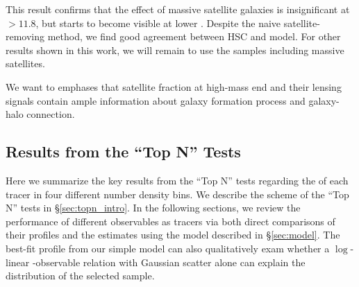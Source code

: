 \documentclass[a4paper,fleqn,usenatbib]{mnras}
\begin{document}
        This result confirms that the effect of massive satellite galaxies is insignificant
            at \logmmax{}$>11.8$, but starts to become visible at lower \mmax{}.
            Despite the naive satellite-removing method, we find good agreement between HSC and
            model.
            For other results shown in this work, we will remain to use the samples including
            massive satellites.

        We want to emphases that satellite fraction at high-mass end and their lensing
            signals contain ample information about galaxy formation process and galaxy-halo
            connection.



\subsection{Results from the ``Top N'' Tests}
    \label{sec:topn_results}

    Here we summarize the key results from the ``Top N'' tests regarding the \sighalo{} of
    each \mvir{} tracer in four different number density bins.
    We describe the scheme of the ``Top N'' tests in \S \ref{sec:topn_intro}.
    In the following sections, we review the performance of different observables as \mvir{}
    tracers via both direct comparisons of their \dsigma{} profiles and the \sighalo{}
    estimates using the model described in \S \ref{sec:model}.
    The best-fit \dsigma{} profile from our simple model can also qualitatively exam whether
    a $\log$-linear \mvir{}-observable relation with Gaussian scatter alone can explain the
    \mvir{} distribution of the selected sample.
\end{document}
